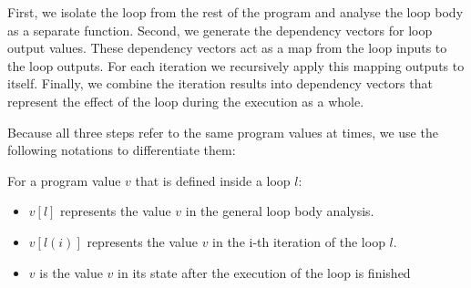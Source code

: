 First, we isolate the loop from the rest of the program and analyse the loop body as a separate function. Second, we generate the dependency vectors for loop output values. These dependency vectors act as a map from the loop inputs to the loop outputs. For each iteration we recursively apply this mapping outputs to itself. Finally, we combine the iteration results into dependency vectors that represent the effect of the loop during the execution as a whole.

Because all three steps refer to the same program values at times, we use the following notations to differentiate them:

For a program value $v$ that is defined inside a loop $l$:
\begin{itemize}
    \setlength\itemsep{0em}
    \item $v[l]$ represents the value $v$ in the general loop body analysis.
    \item $v[l(i)]$ represents the value $v$ in the i-th iteration of the loop $l$.
    \item $v$ is the value $v$ in its state after the execution of the loop is finished
\end{itemize}

